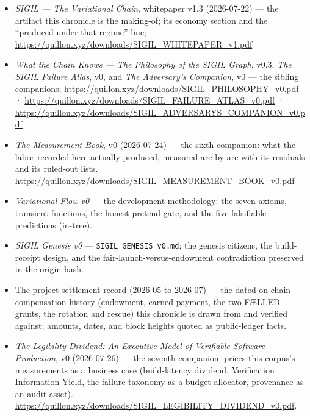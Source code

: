 \documentclass[10pt,a4paper]{article}
\begin{document}
\small
\begin{itemize}[leftmargin=1.2em,itemsep=1pt]
\item \emph{SIGIL — The Variational Chain}, whitepaper v1.3 (2026-07-22) — the artifact
this chronicle is the making-of; its economy section and the ``produced under that regime''
line; \url{https://quillon.xyz/downloads/SIGIL_WHITEPAPER_v1.pdf}
\item \emph{What the Chain Knows — The Philosophy of the SIGIL Graph}, v0.3,
\emph{The SIGIL Failure Atlas}, v0, and \emph{The Adversary's Companion}, v0 — the sibling
companions; \url{https://quillon.xyz/downloads/SIGIL_PHILOSOPHY_v0.pdf} ·
\url{https://quillon.xyz/downloads/SIGIL_FAILURE_ATLAS_v0.pdf} ·
\url{https://quillon.xyz/downloads/SIGIL_ADVERSARYS_COMPANION_v0.pdf}
\item \emph{The Measurement Book}, v0 (2026-07-24) — the sixth companion: what the
labor recorded here actually produced, measured arc by arc with its residuals and its
ruled-out lists. \url{https://quillon.xyz/downloads/SIGIL_MEASUREMENT_BOOK_v0.pdf}
\item \emph{Variational Flow v0} — the development methodology: the seven axioms, transient
functions, the honest-pretend gate, and the five falsifiable predictions (in-tree).
\item \emph{SIGIL Genesis v0} — \texttt{SIGIL\_GENESIS\_v0.md}; the genesis citizens, the
build-receipt design, and the fair-launch-versus-endowment contradiction preserved in the
origin hash.
\item The project settlement record (2026-05 to 2026-07) — the dated on-chain compensation
history (endowment, earned payment, the two FÆLLED grants, the rotation and rescue) this
chronicle is drawn from and verified against; amounts, dates, and block heights quoted as
public-ledger facts.
\item \emph{The Legibility Dividend: An Executive Model of Verifiable Software Production}, v0 (2026-07-26) --- the seventh companion: prices this corpus's measurements as a business case (build-latency dividend, Verification Information Yield, the failure taxonomy as a budget allocator, provenance as an audit asset). \url{https://quillon.xyz/downloads/SIGIL_LEGIBILITY_DIVIDEND_v0.pdf}.
\end{itemize}
\end{document}
